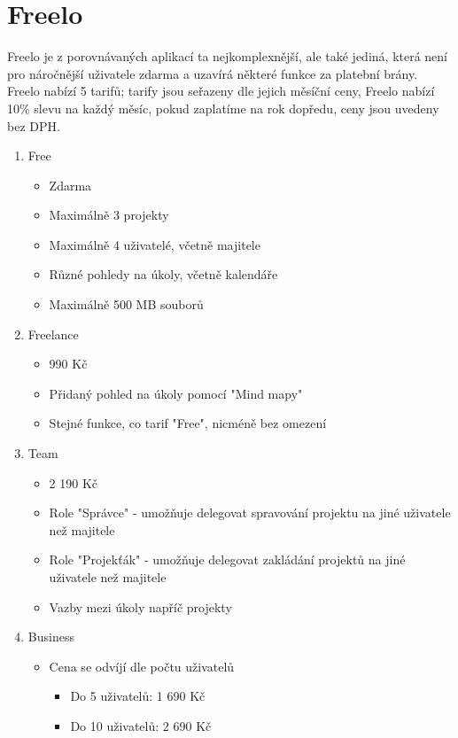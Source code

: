 \section{Freelo}
Freelo je z porovnávaných aplikací ta nejkomplexnější, ale také jediná, která není pro náročnější uživatele zdarma a uzavírá některé funkce za platební brány. Freelo nabízí 5 tarifů; tarify jsou seřazeny dle jejich měsíční ceny, Freelo nabízí 10\% slevu na každý měsíc, pokud zaplatíme na rok dopředu, ceny jsou uvedeny bez DPH\cite{freelo}.
\begin{enumerate}
	\item Free
	      \begin{itemize}
	      	\item Zdarma
	      	\item Maximálně 3 projekty
	      	\item Maximálně 4 uživatelé, včetně majitele
	      	\item Různé pohledy na úkoly, včetně kalendáře
	      	\item Maximálně 500 MB souborů
	      \end{itemize}
	\item Freelance
	      \begin{itemize}
	      	\item 990 Kč
	      	\item Přidaný pohled na úkoly pomocí "Mind mapy"
	      	\item Stejné funkce, co tarif "Free", nicméně bez omezení
	      \end{itemize}
	\item Team
	      \begin{itemize}
	      	\item 2 190 Kč
	      	\item Role "Správce" - umožňuje delegovat spravování projektu na jiné uživatele než majitele
	      	\item Role "Projekťák" - umožňuje delegovat zakládání projektů na jiné uživatele než majitele
	      	\item Vazby mezi úkoly napříč projekty
	      \end{itemize}
	\item Business
	      \begin{itemize}
	      	\item Cena se odvíjí dle počtu uživatelů
	      	      \begin{itemize}
	      	      	\item Do 5 uživatelů: 1 690 Kč
	      	      	\item Do 10 uživatelů: 2 690 Kč

\end{itemize}
\end{itemize}
\end{enumerate}
